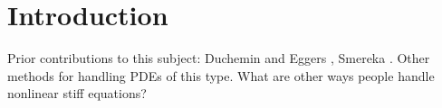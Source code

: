 \chapter{Introduction}
Prior contributions to this subject: Duchemin and Eggers \cite{duchemin2014explicit}, Smereka \cite{smereka2003semi}. Other methods for handling PDEs of this type.
What are other ways people handle nonlinear stiff equations? 